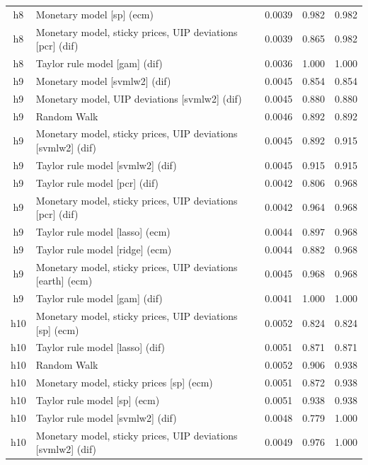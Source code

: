 \begin{ThreePartTable}
\begin{longtable}[t]{cp{5.5cm}ccc}
h8 & \raggedright Monetary model [sp] (ecm) & 0.0039 & 0.982 & 0.982\\
h8 & \raggedright Monetary model, sticky prices, UIP deviations [pcr] (dif) & 0.0039 & 0.865 & 0.982\\
h8 & \raggedright Taylor rule model [gam] (dif) & 0.0036 & 1.000 & 1.000\\
\addlinespace
h9 & \raggedright Monetary model [svmlw2] (dif) & 0.0045 & 0.854 & 0.854\\
h9 & \raggedright Monetary model, UIP deviations [svmlw2] (dif) & 0.0045 & 0.880 & 0.880\\
h9 & \raggedright Random Walk & 0.0046 & 0.892 & 0.892\\
h9 & \raggedright Monetary model, sticky prices, UIP deviations [svmlw2] (dif) & 0.0045 & 0.892 & 0.915\\
h9 & \raggedright Taylor rule model [svmlw2] (dif) & 0.0045 & 0.915 & 0.915\\
h9 & \raggedright Taylor rule model [pcr] (dif) & 0.0042 & 0.806 & 0.968\\
h9 & \raggedright Monetary model, sticky prices, UIP deviations [pcr] (dif) & 0.0042 & 0.964 & 0.968\\
h9 & \raggedright Taylor rule model [lasso] (ecm) & 0.0044 & 0.897 & 0.968\\
h9 & \raggedright Taylor rule model [ridge] (ecm) & 0.0044 & 0.882 & 0.968\\
h9 & \raggedright Monetary model, sticky prices, UIP deviations [earth] (ecm) & 0.0045 & 0.968 & 0.968\\
h9 & \raggedright Taylor rule model [gam] (dif) & 0.0041 & 1.000 & 1.000\\
\addlinespace
h10 & \raggedright Monetary model, sticky prices, UIP deviations [sp] (ecm) & 0.0052 & 0.824 & 0.824\\
h10 & \raggedright Taylor rule model [lasso] (dif) & 0.0051 & 0.871 & 0.871\\
h10 & \raggedright Random Walk & 0.0052 & 0.906 & 0.938\\
h10 & \raggedright Monetary model, sticky prices [sp] (ecm) & 0.0051 & 0.872 & 0.938\\
h10 & \raggedright Taylor rule model [sp] (ecm) & 0.0051 & 0.938 & 0.938\\
h10 & \raggedright Taylor rule model [svmlw2] (dif) & 0.0048 & 0.779 & 1.000\\
h10 & \raggedright Monetary model, sticky prices, UIP deviations [svmlw2] (dif) & 0.0049 & 0.976 & 1.000\\

\end{longtable}
\end{ThreePartTable}
